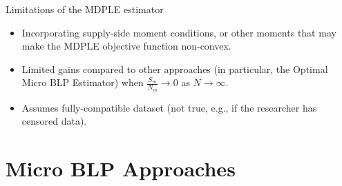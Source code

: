 \documentclass[aspectratio=169,10pt]{beamer}
\begin{document}





\begin{frame}{Limitations of the MDPLE estimator}
    
    \begin{itemize}

        \item Incorporating supply-side moment conditions, or other moments that may make the MDPLE objective function non-convex.
        \item Limited gains compared to other approaches (in particular, the Optimal Micro BLP Estimator) when $\frac{S_m}{N_m}\to 0$ as $N\to\infty$.
        \item Assumes fully-compatible dataset (not true, e.g., if the researcher has censored data).
    \end{itemize}
\end{frame}



\section*{Micro BLP Approaches}
\end{document}
